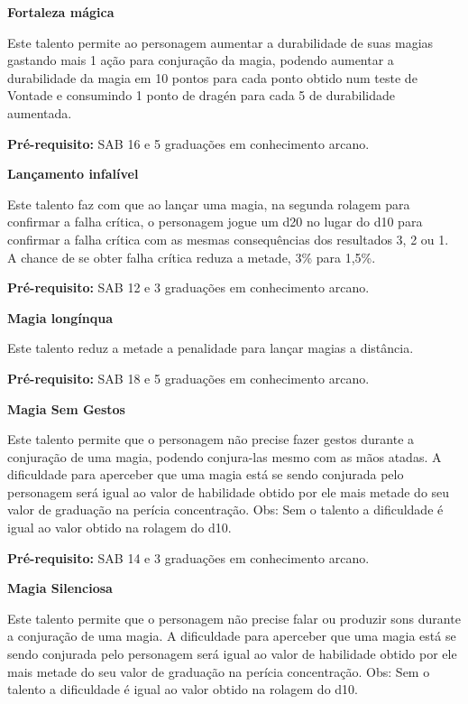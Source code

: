 \textbf{Fortaleza mágica}

Este talento permite ao personagem aumentar a durabilidade de suas magias gastando mais 1 ação para conjuração da magia, podendo aumentar a durabilidade da magia em 10 pontos para cada ponto obtido num teste de Vontade e consumindo 1 ponto de dragén para cada 5 de durabilidade aumentada.

\textbf{Pré-requisito:} SAB 16 e 5 graduações em conhecimento arcano.
\bigskip

\textbf{Lançamento infalível}

Este talento faz com que ao lançar uma magia, na segunda rolagem para confirmar a falha crítica, o personagem jogue um d20 no lugar do d10 para confirmar a falha crítica com as mesmas consequências dos resultados 3, 2 ou 1. A chance de se obter falha crítica reduza a metade, 3\% para 1,5\%.

\textbf{Pré-requisito:} SAB 12 e 3 graduações em conhecimento arcano.
\bigskip

\textbf{Magia longínqua}

Este talento reduz a metade a penalidade para lançar magias a distância.

\textbf{Pré-requisito:} SAB 18 e 5 graduações em conhecimento arcano.
\bigskip

\textbf{Magia Sem Gestos}

Este talento permite que o personagem não precise fazer gestos durante a conjuração de uma magia, podendo conjura-las mesmo com as mãos atadas. A dificuldade para aperceber que uma magia está se sendo conjurada pelo personagem será igual ao valor de habilidade obtido por ele mais metade do seu valor de graduação na perícia concentração. Obs: Sem o talento a dificuldade é igual ao valor obtido na rolagem do d10.

\textbf{Pré-requisito:} SAB 14 e 3 graduações em conhecimento arcano.
\bigskip

\textbf{Magia Silenciosa}

Este talento permite que o personagem não precise falar ou produzir sons durante a conjuração de uma magia. A dificuldade para aperceber que uma magia está se sendo conjurada pelo personagem será igual ao valor de habilidade obtido por ele mais metade do seu valor de graduação na perícia concentração. Obs: Sem o talento a dificuldade é igual ao valor obtido na rolagem do d10.

